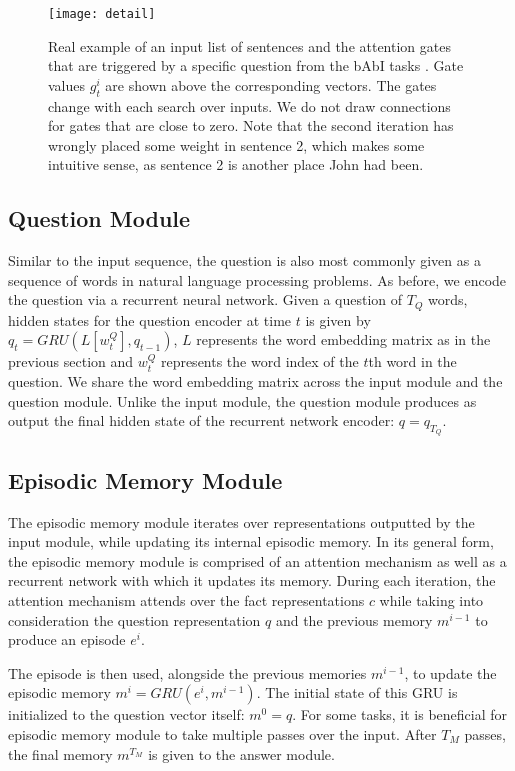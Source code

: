 \documentclass{article}
\begin{document}
\begin{figure*}[t!]
\texttt{[image: detail]}
\caption{Real example of an input list of sentences and the attention gates that are triggered by a specific question from the bAbI tasks \cite{Weston2015ToyTasks}. Gate values $g^i_t$ are shown above the corresponding vectors. The gates change with each search over inputs. We do not draw connections for gates that are close to zero. Note that the second iteration has wrongly placed some weight in sentence 2, which makes some intuitive sense, as sentence 2 is another place John had been.}
\label{fig:ExampleDMN}
\end{figure*}

\subsection{Question Module}

Similar to the input sequence, the question is also most commonly given as a sequence of words in natural language processing problems. As before, we encode the question via a recurrent neural network. Given a question of $T_Q$ words, hidden states for the question encoder at time $t$ is given by $q_t = GRU(L[w^Q_t], q_{t-1})$,  $L$ represents the word embedding matrix as in the previous section and $w^Q_t$ represents the word index of the $t$th word in the question. We share the word embedding matrix across the input module and the question module. Unlike the input module, the question module produces as output the final hidden state of the recurrent network encoder: $q = q_{T_Q}$.


\subsection{Episodic Memory Module}
The episodic memory module iterates over representations outputted by the input module, while updating its internal episodic memory. In its general form, the episodic memory module is comprised of an attention mechanism as well as a recurrent network with which it updates its memory. During each iteration, the attention mechanism attends over the fact representations $c$ while taking into consideration the question representation $q$ and the previous memory $m^{i-1}$ to produce an episode $e^i$. 

The episode is then used, alongside the previous memories $m^{i-1}$, to update the episodic memory $m^{i} = GRU(e^i, m^{i-1})$. The initial state of this GRU is initialized to the question vector itself: $m^0 = q$. For some tasks, it is beneficial for episodic memory module to take multiple passes over the input. After $T_M$ passes, the final memory $m^{T_M}$ is given to the answer module.
 
\end{document}

